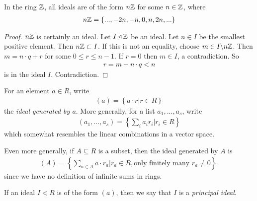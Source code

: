 \documentclass[a4paper]{article}
\begin{document}
\begin{eg}
In the ring $\mathbb{Z}$, all ideals are of the form $n\mathbb{Z}$ for some $n \in \mathbb{Z}$, where
\begin{equation*}
\begin{aligned}
n\mathbb{Z} =\{...,-2n,-n,0,n,2n,...\}
\end{aligned}
\end{equation*}
\begin{proof}
$n \mathbb{Z}$ is certainly an ideal. Let $I \triangleleft \mathbb{Z}$ be an ideal. Let $n \in I$ be the smallest positive element. Then $n \mathbb{Z} \subset I$. If this is not an equality, choose $m \in I\backslash n\mathbb{Z}$. Then $m=n \cdot q + r$ for some $0\leq r \leq n-1$. If $r=0$ then $m \in I$, a contradiction. So
\begin{equation*}
\begin{aligned}
r=m-n\cdot q < n
\end{aligned}
\end{equation*}
is in the ideal $I$. Contradiction.
\end{proof}
\end{eg}

\begin{defi}
For an element $a \in R$, write
\begin{equation*}
\begin{aligned}
(a) = \left\{a \cdot r | r \in R\right\}
\end{aligned}
\end{equation*}
the \emph{ideal generated by $a$}. More generally, for a list $a_1,...,a_s$, write
\begin{equation*}
\begin{aligned}
(a_1,...,a_s) = \left\{\sum_i a_i r_i | r_i \in R\right\}
\end{aligned}
\end{equation*}
which somewhat resembles the linear combinations in a vector space.

Even more generally, if $A \subseteq R$ is a subset, then the ideal generated by $A$ is
\begin{equation*}
\begin{aligned}
\left(A\right) = \left\{\sum_{a \in A} a \cdot r_a | r_a \in R, \text{only finitely many }r_a \neq 0\right\}.
\end{aligned}
\end{equation*}
since we have no definition of infinite sums in rings.

If an ideal $I\triangleleft R$ is of the form $(a)$, then we say that $I$ is a \emph{principal ideal}.
\end{defi}
\end{document}

